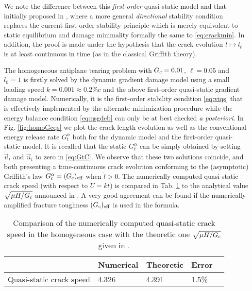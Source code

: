 We note the difference between this \emph{first-order} quasi-static model and that initially proposed in \cite{PhamMarigo:2010-1}, where a more general \emph{directional} stability condition replaces the current first-order stability principle which is merely equivalent to static equilibrium and damage minimality formally the same to \eqref{eq:crackmin}. In addition, the proof is made under the hypothesis that the crack evolution $t\mapsto l_t$ is at least continuous in time (as in the classical Griffith theory).

The homogeneous antiplane tearing problem with $G_\mathrm{c}=0.01$, $\ell=0.05$ and $l_0=1$ is firstly solved by the dynamic gradient damage model using a small loading speed $k=0.001\approx 0.2\%c$ and the above first-order quasi-static gradient damage model. Numerically, it is the first-order stability condition \eqref{eq:viqs} that is effectively implemented by the alternate minimization procedure \cite{PhamAmorMarigoMaurini:2011} while the energy balance condition \eqref{eq:qsgdeb} can only be at best checked \emph{a posteriori}. In Fig. \ref{fig:homoGcqs} we plot the crack length evolution as well as the conventional energy release rate $G^\alpha_t$ both for the dynamic model and the first-order quasi-static model. It is recalled that the static $G^\alpha_t$ can be simply obtained by setting $\dot{\vec{u}}_t$ and $\ddot{\vec{u}}_t$ to zero in \eqref{eq:GtC}. We observe that these two solutions coincide, and both presenting a time-continuous crack evolution conforming to the (asymptotic) Griffith's law $G^\alpha_t=(G_\mathrm{c})_\mathrm{eff}$ when $\dot{l}>0$. The numerically computed quasi-static crack speed (with respect to $U=kt$) is compared in Tab. \ref{tab:compqsv} to the analytical value $\sqrt{\mu H/G_\mathrm{c}}$ announced in \cite{BourdinFrancfortMarigo:2008}. A very good agreement can be found if the numerically amplified fracture toughness $(G_\mathrm{c})_\mathrm{eff}$ is used in the formula.
\begin{table}[htbp]
\centering
\caption{Comparison of the numerically computed quasi-static crack speed in the homogeneous case with the theoretic one $\sqrt{\mu H/G_\mathrm{c}}$ given in \cite{BourdinFrancfortMarigo:2008}.} \label{tab:compqsv}
\begin{tabular}{lllll} \toprule
& Numerical & Theoretic & Error \\ \midrule
Quasi-static crack speed & 4.326 & 4.391 & 1.5\% \\ \bottomrule
\end{tabular}
\end{table}
